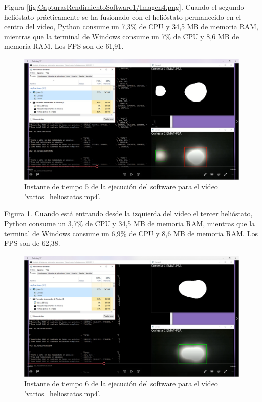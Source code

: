 Figura \ref{fig:CapturasRendimientoSoftware1/Imagen4.png}. Cuando el segundo helióstato prácticamente se ha fusionado con el helióstato permanecido en el centro del vídeo, Python consume un 7,3\% de CPU y 34,5 MB de memoria RAM, mientras que la terminal de Windows consume un 7\% de CPU y 8,6 MB de memoria RAM. Los FPS son de 61,91.\\[20pt]

\begin{figure}[h!]
  	\centering
	\includegraphics[width=\textwidth]{CapturasRendimientoSoftware1/Imagen5.png}
	\caption{Instante de tiempo 5 de la ejecución del software para el vídeo 'varios\_heliostatos.mp4'.
	\label{fig:CapturasRendimientoSoftware1/Imagen5.png}}
\end{figure}

Figura \ref{fig:CapturasRendimientoSoftware1/Imagen5.png}. Cuando está entrando desde la izquierda del vídeo el tercer helióstato, Python consume un 3,7\% de CPU y 34,5 MB de memoria RAM, mientras que la terminal de Windows consume un 6,9\% de CPU y 8,6 MB de memoria RAM. Los FPS son de 62,38.\\[20pt]

\begin{figure}[h!]
  	\centering
	\includegraphics[width=\textwidth]{CapturasRendimientoSoftware1/Imagen6.png}
	\caption{Instante de tiempo 6 de la ejecución del software para el vídeo 'varios\_heliostatos.mp4'.
	\label{fig:CapturasRendimientoSoftware1/Imagen6.png}}
\end{figure}

